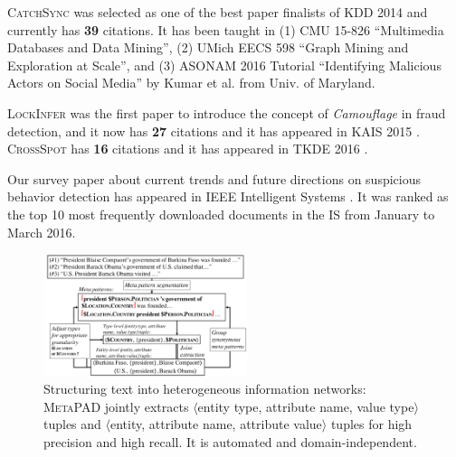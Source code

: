 \documentclass[10.5pt]{article}
\newcommand{\lb}{\mbox{$\langle$}}
\newcommand{\rb}{\mbox{$\rangle$}}
\newcommand{\tuple}[3]{{\lb#1, #2, #3\rb}\xspace}
\begin{document}
\begin{compactitem}
\item \textsc{CatchSync} \cite{jiang2014catchsync} was selected as one of the best paper finalists of KDD 2014 and currently has \textbf{39} citations. It has been taught in (1) CMU 15-826 ``Multimedia Databases and Data Mining'', (2) UMich EECS 598 ``Graph Mining and Exploration at Scale'', and (3) ASONAM 2016 Tutorial ``Identifying Malicious Actors on Social Media'' by Kumar et al. from Univ. of Maryland.
\item \textsc{LockInfer} \cite{jiang2014inferring} was the first paper to introduce the concept of \textit{Camouflage} in fraud detection, and it now has \textbf{27} citations and it has appeared in KAIS 2015 \cite{jiang2015inferring}. \textsc{CrossSpot} \cite{jiang2015general} has \textbf{16} citations and it has appeared in TKDE 2016 \cite{jiang2016spotting}. %
\item Our survey paper about current trends and future directions on suspicious behavior detection has appeared in IEEE Intelligent Systems \cite{jiang2016suspicious}. It was ranked as the top 10 most frequently downloaded documents in the IS from January to March 2016.
\end{compactitem}

\vskip 0.03in
\vskip 0.01in


\begin{figure}
\vskip -0.18in
\includegraphics[width=0.53\textwidth]{figure/metapad.pdf}
\vskip -0.18in
\caption{Structuring text into heterogeneous information networks: \textsc{MetaPAD} jointly extracts \tuple{entity type}{attribute name}{value type} tuples and \tuple{entity}{attribute name}{attribute value} tuples for high precision and high recall. It is automated and domain-independent.}
\label{fig:metapad}
\vskip -0.12in
\end{figure}
\end{document}
